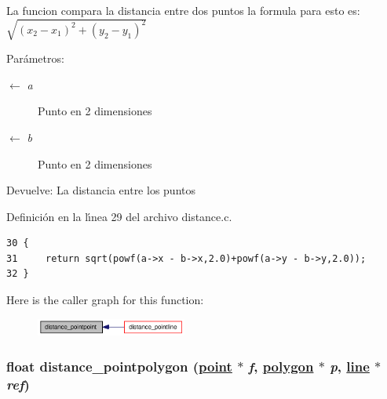 La funcion compara la distancia entre dos puntos la formula para esto es: $\sqrt{(x_2 - x_1)^2 + (y_2 - y_1)^2}$

\begin{Desc}
\item[Par\'{a}metros:]
\begin{description}
\item[\mbox{$\leftarrow$} {\em a}]Punto en 2 dimensiones \item[\mbox{$\leftarrow$} {\em b}]Punto en 2 dimensiones \end{description}
\end{Desc}
\begin{Desc}
\item[Devuelve:]La distancia entre los puntos \end{Desc}


Definici\'{o}n en la l\'{\i}nea 29 del archivo distance.c.

\begin{Code}\begin{verbatim}30 {
31     return sqrt(powf(a->x - b->x,2.0)+powf(a->y - b->y,2.0));
32 }
\end{verbatim}\end{Code}




Here is the caller graph for this function:\begin{figure}[H]
\begin{center}
\leavevmode
\includegraphics[width=140pt]{group__distance_g3b2b03f846e6b587be683ec8b853e774_g3b2b03f846e6b587be683ec8b853e774_icgraph}
\end{center}
\end{figure}
\hypertarget{group__distance_g25716e8d1c8abaf08903bbcd08b8d6e5_g25716e8d1c8abaf08903bbcd08b8d6e5}{
\subsubsection[distance\_\-pointpolygon]{\setlength{\rightskip}{0pt plus 5cm}float distance\_\-pointpolygon (\hyperlink{struct__point}{point} $\ast$ {\em f}, \hyperlink{struct__polygon}{polygon} $\ast$ {\em p}, \hyperlink{struct__line}{line} $\ast$ {\em ref})}}
\label{group__distance_g25716e8d1c8abaf08903bbcd08b8d6e5_g25716e8d1c8abaf08903bbcd08b8d6e5}


